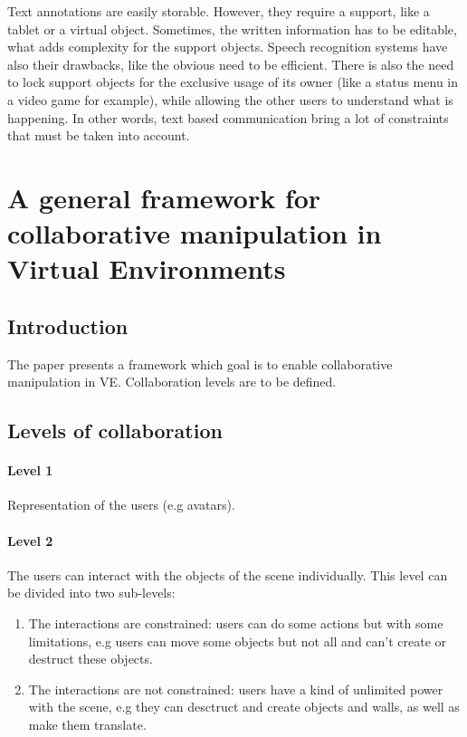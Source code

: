 \documentclass[a4paper]{article}
\begin{document}
Text annotations are easily storable. However, they require a support, like a tablet or a virtual object. Sometimes, the written information has to be editable, what adds complexity for the support objects. Speech recognition systems have also their drawbacks, like the obvious need to be efficient. There is also the need to lock support objects for the exclusive usage of its owner (like a status menu in a video game for example), while allowing the other users to understand what is happening. In other words, text based communication bring a lot of constraints that must be taken into account.


\section{A general framework for collaborative manipulation in Virtual Environments}

\subsection{Introduction}
The paper presents a framework which goal is to enable collaborative manipulation in VE. Collaboration levels are to be defined.

\subsection{Levels of collaboration}
\paragraph{Level 1} Representation of the users (e.g avatars).
\paragraph{Level 2} The users can interact with the objects of the scene individually. This level can be divided into two sub-levels:
\begin{enumerate}
	\item The interactions are constrained: users can do some actions but with some limitations, e.g users can move some objects but not all and can't create or destruct these objects.
	\item The interactions are not constrained: users have a kind of unlimited power with the scene, e.g they can desctruct and create objects and walls, as well as make them translate.
\end{enumerate}
\end{document}
